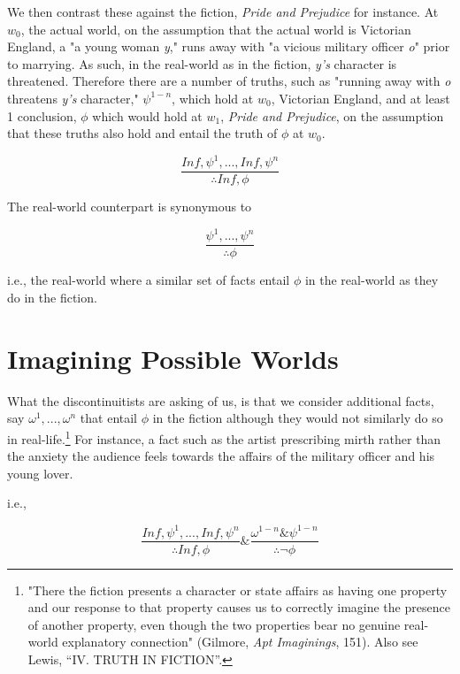 \documentclass[phdthesis,12pt,final]{wuthesis}
\theoremstyle{definition}
\theoremstyle{definition}
\theoremstyle{definition}
\theoremstyle{definition}
\theoremstyle{remark}
\begin{document}
We then contrast these against the fiction, \emph{Pride and Prejudice} for instance. At \(w_{0}\), the actual world, on the assumption that the actual world is Victorian England, a "a young woman \emph{y}," runs away with "a vicious military officer \emph{o}" prior to marrying. As such, in the real-world as in the fiction, \emph{y's} character is threatened. Therefore there are a number of truths, such as "running away with \emph{o} threatens \emph{y's} character," \(\psi^{1-n}\), which hold at \(w_{0}\), Victorian England, and at least 1 conclusion, \(\phi\) which would hold at \(w_{1}\), \emph{Pride and Prejudice}, on the assumption that these truths also hold and entail the truth of \(\phi\) at \(w_{0}\).

\[\frac{In f, \psi^{1}, . . ., In f, \psi^{n}}{\therefore In f, \phi}\]

\noindent The real-world counterpart is synonymous to

\[\frac{\psi^{1}, . . ., \psi^{n}}{\therefore\phi}\]

\noindent i.e., the real-world where a similar set of facts entail \(\phi\) in the real-world as they do in the fiction.

\section{Imagining Possible Worlds}\label{imagining-possible-worlds}

What the discontinuitists are asking of us, is that we consider additional facts, say \(\omega^{1}, . . ., \omega^{n}\) that entail \(\phi\) in the fiction although they would not similarly do so in real-life.\footnote{"There the fiction presents a character or state affairs as having one property and our response to that property causes us to correctly imagine the presence of another property, even though the two properties bear no genuine real-world explanatory connection" (Gilmore, \emph{Apt {Imaginings}}, 151). Also see Lewis, {``{IV}. {TRUTH IN FICTION}''}.} For instance, a fact such as the artist prescribing mirth rather than the anxiety the audience feels towards the affairs of the military officer and his young lover.

\noindent i.e.,

\[\frac{In f, \psi^{1}, . . ., In f, \psi^{n}}{\therefore In f, \phi} \& \frac{\omega^{1-n} \& \psi^{1-n}}{\therefore\neg\phi}\]
\end{document}
